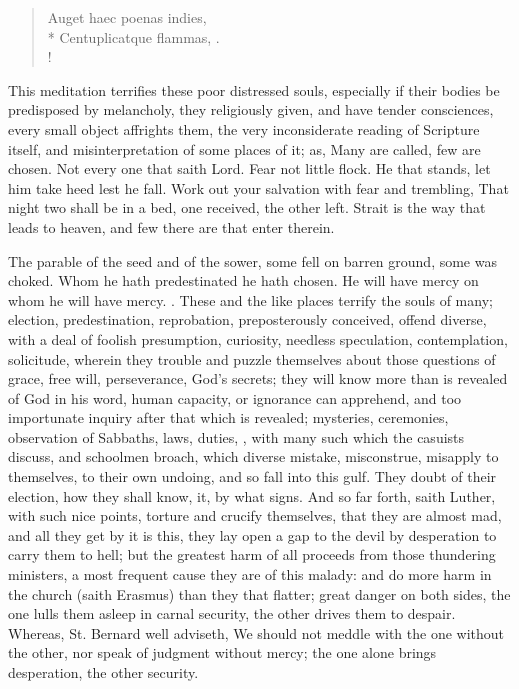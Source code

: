 {\begin{latin}
\begin{verse}
Auget haec poenas indies,\\*
Centuplicatque flammas, \etc{}.\\!
\end{verse}
\end{latin}

This meditation terrifies these poor distressed souls, especially if
their bodies be predisposed by melancholy, they religiously given, and
have tender consciences, every small object affrights them, the very
inconsiderate reading of Scripture itself, and misinterpretation of
some places of it; as, Many are called, few are chosen. Not every one
that saith Lord. Fear not little flock. He that stands, let him take
heed lest he fall. Work out your salvation with fear and trembling,
That night two shall be in a bed, one received, the other left. Strait
is the way that leads to heaven, and few there are that enter therein.

The parable of the seed and of the sower, some fell on barren ground,
some was choked. Whom he hath predestinated he hath chosen. He will
have mercy on whom he will have mercy. . These and the like places terrify the souls of
many; election, predestination, reprobation, preposterously conceived,
offend diverse, with a deal of foolish presumption, curiosity, needless
speculation, contemplation, solicitude, wherein they trouble and puzzle
themselves about those questions of grace, free will, perseverance,
God's secrets; they will know more than is revealed of God in his word,
human capacity, or ignorance can apprehend, and too importunate inquiry
after that which is revealed; mysteries, ceremonies, observation of
Sabbaths, laws, duties, \etc{}, with many such which the casuists discuss,
and schoolmen broach, which diverse mistake, misconstrue, misapply to
themselves, to their own undoing, and so fall into this gulf. They
doubt of their election, how they shall know, it, by what signs. And so
far forth, saith Luther, with such nice points, torture and crucify
themselves, that they are almost mad, and all they get by it is this,
they lay open a gap to the devil by desperation to carry them to hell;
but the greatest harm of all proceeds from those thundering ministers,
a most frequent cause they are of this malady: and do more harm
in the church (saith Erasmus) than they that flatter; great danger on
both sides, the one lulls them asleep in carnal security, the other
drives them to despair. Whereas, St. Bernard well adviseth, We
should not meddle with the one without the other, nor speak of judgment
without mercy; the one alone brings desperation, the other security.

}
